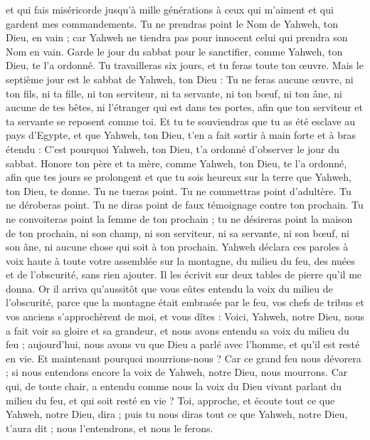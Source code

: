 \begin{multicols}{2}
et qui fais miséricorde jusqu'à mille générations à ceux qui m'aiment et qui gardent mes commandements.
Tu ne prendras point le Nom de Yahweh, ton Dieu, en vain ; car Yahweh ne tiendra pas pour innocent celui qui prendra son Nom en vain.
Garde le jour du sabbat pour le sanctifier, comme Yahweh, ton Dieu, te l'a ordonné.
Tu travailleras six jours, et tu feras toute ton œuvre.
Mais le septième jour est le sabbat de Yahweh, ton Dieu : Tu ne feras aucune œuvre, ni ton fils, ni ta fille, ni ton serviteur, ni ta servante, ni ton bœuf, ni ton âne, ni aucune de tes bêtes, ni l’étranger qui est dans tes portes, afin que ton serviteur et ta servante se reposent comme toi.
Et tu te souviendras que tu as été esclave au pays d'Egypte, et que Yahweh, ton Dieu, t'en a fait sortir à main forte et à bras étendu : C'est pourquoi Yahweh, ton Dieu, t'a ordonné d’observer le jour du sabbat.
Honore ton père et ta mère, comme Yahweh, ton Dieu, te l'a ordonné, afin que tes jours se prolongent et que tu sois heureux sur la terre que Yahweh, ton Dieu, te donne.
Tu ne tueras point.
Tu ne commettras point d’adultère.
Tu ne déroberas point.
Tu ne diras point de faux témoignage contre ton prochain.
Tu ne convoiteras point la femme de ton prochain ; tu ne désireras point la maison de ton prochain, ni son champ, ni son serviteur, ni sa servante, ni son bœuf, ni son âne, ni aucune chose qui soit à ton prochain.
Yahweh déclara ces paroles à voix haute à toute votre assemblée sur la montagne, du milieu du feu, des nuées et de l'obscurité, sans rien ajouter. Il les écrivit sur deux tables de pierre qu'il me donna.
Or il arriva qu’aussitôt que vous eûtes entendu la voix du milieu de l'obscurité, parce que la montagne était embrasée par le feu, vos chefs de tribus et vos anciens s’approchèrent de moi,
et vous dîtes : Voici, Yahweh, notre Dieu, nous a fait voir sa gloire et sa grandeur, et nous avons entendu sa voix du milieu du feu ; aujourd'hui, nous avons vu que Dieu a parlé avec l'homme, et qu’il est resté en vie.
Et maintenant pourquoi mourrions-nous ? Car ce grand feu nous dévorera ; si nous entendons encore la voix de Yahweh, notre Dieu, nous mourrons.
Car qui, de toute chair, a entendu comme nous la voix du Dieu vivant parlant du milieu du feu, et qui soit resté en vie ?
Toi, approche, et écoute tout ce que Yahweh, notre Dieu, dira ; puis tu nous diras tout ce que Yahweh, notre Dieu, t'aura dit ; nous l'entendrons, et nous le ferons.

\end{multicols}
